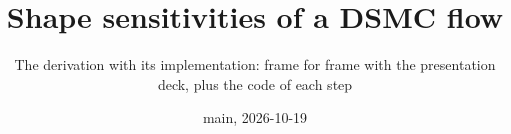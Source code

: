 \documentclass[10pt,aspectratio=169]{beamer}
\title{Shape sensitivities of a DSMC flow}
\subtitle{The derivation with its implementation: frame for frame with the presentation
deck, plus the code of each step}
\date{main, 2026-10-19}
\begin{document}
\begin{frame}
\titlepage
\end{frame}

\appendix

\end{document}
